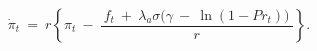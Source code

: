 \begin{equation}
    \dot{\pi}_{t} \ = \ r \left\{ \pi_{t} \ - \ \frac{ \ f_{t} \ + \ \lambda_{a} \sigma \big( \gamma \ - \ \ln(1 - Pr_{t}) \big) \ }{r} \right\}.
\label{Equation:Social-Planners-Problem_Growth-Rate-of-Costate-Variable}
\end{equation}